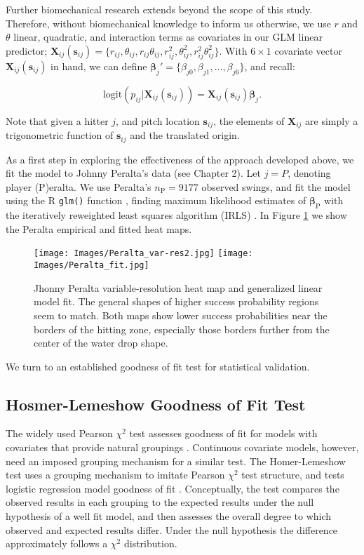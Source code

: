 Further biomechanical research extends beyond the scope of this study. Therefore, without biomechanical knowledge to inform us otherwise, we use $r$ and $\theta$ linear, quadratic, and interaction terms as covariates in our GLM linear predictor; $\pmb{X}_{ij}(\pmb{s}_{ij}) = \{r_{ij}, \theta_{ij}, r_{ij}\theta_{ij}, r_{ij}^{2}, \theta_{ij}^{2}, r_{ij}^{2}\theta_{ij}^{2}\}$. With $6 \times 1$ covariate vector $\pmb{X}_{ij}(\pmb{s}_{ij})$ in hand, we can define $\pmb{\beta}_{j}' =  \{\beta_{j0}, \beta_{j1}, \dots, \beta_{j6}\}$, and recall:

\begin{equation} \label{eq:glm}
\text{logit}(p_{ij}|\pmb{X}_{ij}(\pmb{s}_{ij})) = \pmb{X}_{ij}(\pmb{s}_{ij}) \pmb{\beta}_{j}.
\end{equation}

Note that given a hitter $j$, and pitch location $\pmb{s}_{ij}$, the elements of $\pmb{X}_{ij}$ are simply a trigonometric function of $\pmb{s}_{ij}$ and the translated origin.

As a first step in exploring the effectiveness of the approach developed above, we fit the model to Johnny Peralta's data (see Chapter 2). Let $j = P$, denoting player (P)eralta. We use Peralta's $n_{\text{P}} = 9177$ observed swings, and fit the model using the R \verb|glm()| function , finding maximum likelihood estimates of $\pmb{\beta}_{\text{P}}$ with the iteratively reweighted least squares algorithm (IRLS) \citep{Myers2012}. In Figure \ref{fig:empvsfit} we show the Peralta empirical and fitted heat maps.
  \begin{figure}[!ht]
    \centering
    \texttt{[image: Images/Peralta\_var-res2.jpg]}
    \texttt{[image: Images/Peralta\_fit.jpg]}
    \caption{Jhonny Peralta variable-resolution heat map and generalized linear model fit. The general shapes of higher success probability regions seem to match. Both maps show lower success probabilities near the borders of the hitting zone, especially those borders further from the center of the water drop shape.}
    \label{fig:empvsfit}
  \end{figure}
We turn to an established goodness of fit test for statistical validation.

\subsection{Hosmer-Lemeshow Goodness of Fit Test} %

The widely used Pearson $\chi^{2}$ test assesses goodness of fit for models with covariates that provide natural groupings \citep{Pagano2000}. Continuous covariate models, however, need an imposed grouping mechanism for a similar test. The Homer-Lemeshow test uses a grouping mechanism to imitate Pearson $\chi^{2}$ test structure, and tests logistic regression model goodness of fit \citep{Hosmer2013}. Conceptually, the test compares the observed results in each grouping to the expected results under the null hypothesis of a well fit model, and then assesses the overall degree to which observed and expected results differ. Under the null hypothesis the difference approximately follows a $\chi^{2}$ distribution. 

